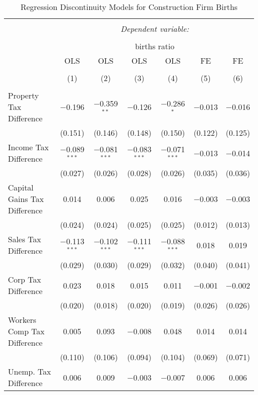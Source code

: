 
\begin{table}[!htbp] \centering 
  \caption{Regression Discontinuity Models for  Construction Firm Births} 
  \label{23rd} 
\begin{tabular}{@{\extracolsep{5pt}}lcccccc} 
\\[-1.8ex]\hline 
\hline \\[-1.8ex] 
 & \multicolumn{6}{c}{\textit{Dependent variable:}} \\ 
\cline{2-7} 
\\[-1.8ex] & \multicolumn{6}{c}{births ratio} \\ 
 & OLS & OLS & OLS & OLS & FE & FE \\ 
\\[-1.8ex] & (1) & (2) & (3) & (4) & (5) & (6)\\ 
\hline \\[-1.8ex] 
 Property Tax Difference & $-$0.196 & $-$0.359$^{**}$ & $-$0.126 & $-$0.286$^{*}$ & $-$0.013 & $-$0.016 \\ 
  & (0.151) & (0.146) & (0.148) & (0.150) & (0.122) & (0.125) \\ 
  Income Tax Difference & $-$0.089$^{***}$ & $-$0.081$^{***}$ & $-$0.083$^{***}$ & $-$0.071$^{***}$ & $-$0.013 & $-$0.014 \\ 
  & (0.027) & (0.026) & (0.028) & (0.026) & (0.035) & (0.036) \\ 
  Capital Gains Tax Difference & 0.014 & 0.006 & 0.025 & 0.016 & $-$0.003 & $-$0.003 \\ 
  & (0.024) & (0.024) & (0.025) & (0.025) & (0.012) & (0.013) \\ 
  Sales Tax Difference & $-$0.113$^{***}$ & $-$0.102$^{***}$ & $-$0.111$^{***}$ & $-$0.088$^{***}$ & 0.018 & 0.019 \\ 
  & (0.029) & (0.030) & (0.029) & (0.032) & (0.040) & (0.041) \\ 
  Corp Tax Difference & 0.023 & 0.018 & 0.015 & 0.011 & $-$0.001 & $-$0.002 \\ 
  & (0.020) & (0.018) & (0.020) & (0.019) & (0.026) & (0.026) \\ 
  Workers Comp Tax Difference & 0.005 & 0.093 & $-$0.008 & 0.048 & 0.014 & 0.014 \\ 
  & (0.110) & (0.106) & (0.094) & (0.104) & (0.069) & (0.071) \\ 
  Unemp. Tax Difference & 0.006 & 0.009 & $-$0.003 & $-$0.007 & 0.006 & 0.006 \\ 

\end{tabular}
\end{table}
